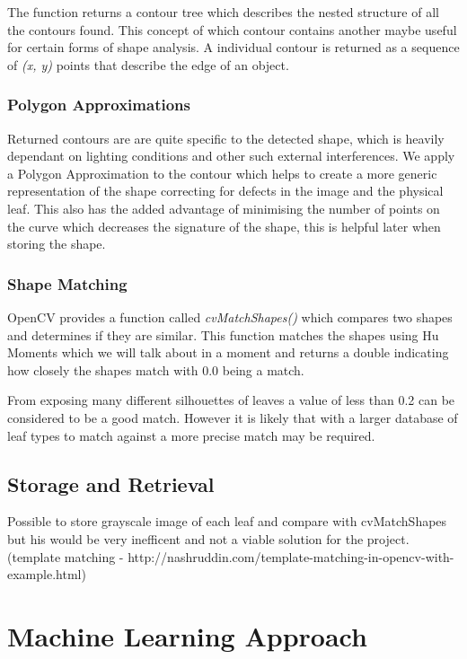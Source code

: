 The function returns a contour tree which describes the nested structure of all the contours found. This concept of which contour contains another maybe useful for certain forms of shape analysis. A individual contour is returned as a sequence of \emph{(x, y)} points that describe the edge of an object.


\subsubsection{Polygon Approximations}
Returned contours are are quite specific to the detected shape, which is heavily dependant on lighting conditions and other such external interferences. We apply a Polygon Approximation to the contour which helps to create a more generic representation of the shape correcting for defects in the image and the physical leaf. This also has the added advantage of minimising the number of points on the curve which decreases the signature of the shape, this is helpful later when storing the shape.

\subsubsection{Shape Matching}
OpenCV provides a function called \emph{cvMatchShapes()} which compares two shapes and determines if they are similar. This function matches the shapes using Hu Moments which we will talk about in a moment and returns a double indicating how closely the shapes match with 0.0 being a match.

From exposing many different silhouettes of leaves a value of less than 0.2 can be considered to be a good match. However it is likely that with a larger database of leaf types to match against a more precise match may be required.


\subsection{Storage and Retrieval}
Possible to store grayscale image of each leaf and compare with cvMatchShapes but his would be very inefficent and not a viable solution for the project. (template matching - http://nashruddin.com/template-matching-in-opencv-with-example.html)
\section{Machine Learning Approach}
